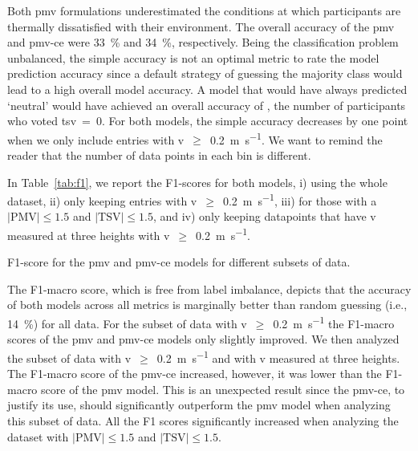Both \ac{pmv} formulations underestimated the conditions at which participants are thermally dissatisfied with their environment.
The overall accuracy of the \ac{pmv} and \ac{pmv-ce} were \qty{33}{\percent} and \qty{34}{\percent}, respectively.
Being the classification problem unbalanced, the simple accuracy is not an optimal metric to rate the model prediction accuracy since a default strategy of guessing the majority class would lead to a high overall model accuracy.
A model that would have always predicted `neutral' would have achieved an overall accuracy of , the number of participants who voted \ac{tsv}~=~0.
For both models, the simple accuracy decreases by one point when we only include entries with \ac{v}~$\geq$~\qty{0.2}{\m\per\s}.
We want to remind the reader that the number of data points in each bin is different.

In Table~\ref{tab:f1}, we report the F1-scores for both models, i) using the whole dataset, ii) only keeping entries with \ac{v}~$\geq$~\qty{0.2}{\m\per\s}, iii) for those with a $\lvert \textrm{PMV}\lvert \leq 1.5$ and $\lvert \textrm{TSV}\lvert \leq 1.5$, and iv) only keeping datapoints that have \ac{v} measured at three heights with \ac{v}~$\geq$~\qty{0.2}{\m\per\s}.
\begin{table}[htb!]
    \centering
    
    \caption{F1-score for the \ac{pmv} and \ac{pmv-ce} models for different subsets of data.}
    \label{tab:f1}
\end{table}
The F1-macro score, which is free from label imbalance, depicts that the accuracy of both models across all metrics is marginally better than random guessing (i.e., \qty{14}{\percent}) for all data.
For the subset of data with \ac{v}~$\geq$~\qty{0.2}{\m\per\s} the F1-macro scores of the \ac{pmv} and \ac{pmv-ce} models only slightly improved.
We then analyzed the subset of data with \ac{v}~$\geq$~\qty{0.2}{\m\per\s} and with \ac{v} measured at three heights.
The F1-macro score of the \ac{pmv-ce} increased, however, it was lower than the F1-macro score of the \ac{pmv} model.
This is an unexpected result since the \ac{pmv-ce}, to justify its use, should significantly outperform the \ac{pmv} model when analyzing this subset of data.
All the F1 scores significantly increased when analyzing the dataset with $\lvert \textrm{PMV}\lvert \leq 1.5$ and $\lvert \textrm{TSV}\lvert \leq 1.5$.


